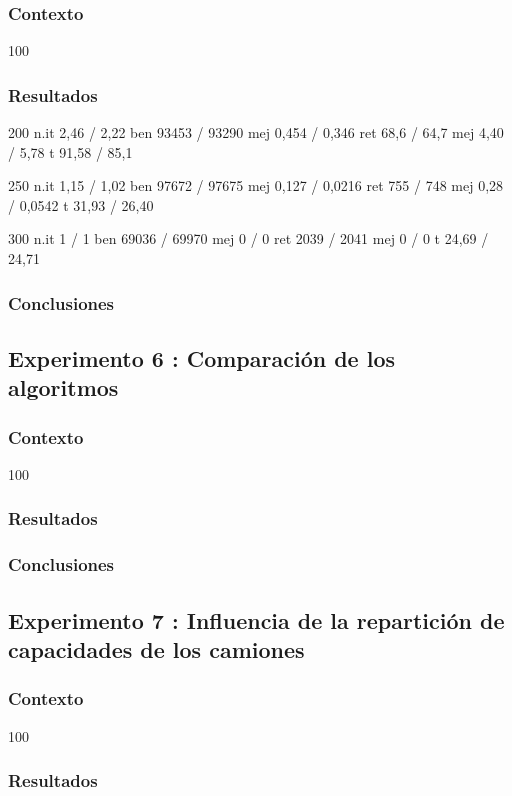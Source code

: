 \documentclass{article}
\begin{document}
\subsubsection{Contexto}
100

\subsubsection{Resultados}

200
n.it 2,46 / 2,22
ben 93453 / 93290
mej 0,454 / 0,346
ret 68,6 / 64,7
mej 4,40 / 5,78
t 91,58 / 85,1

250
n.it 1,15 / 1,02
ben 97672 / 97675
mej 0,127 / 0,0216
ret 755 / 748
mej 0,28 / 0,0542
t 31,93 / 26,40

300
n.it 1 / 1
ben 69036 / 69970
mej 0 / 0
ret 2039 / 2041
mej 0 / 0
t 24,69 / 24,71

\subsubsection{Conclusiones}

\subsection{Experimento 6 : Comparación de los algoritmos}

\subsubsection{Contexto}
100

\subsubsection{Resultados}
\subsubsection{Conclusiones}

\subsection{Experimento 7 : Influencia de la repartición de capacidades
de los camiones}

\subsubsection{Contexto}
100

\subsubsection{Resultados}
\end{document}
